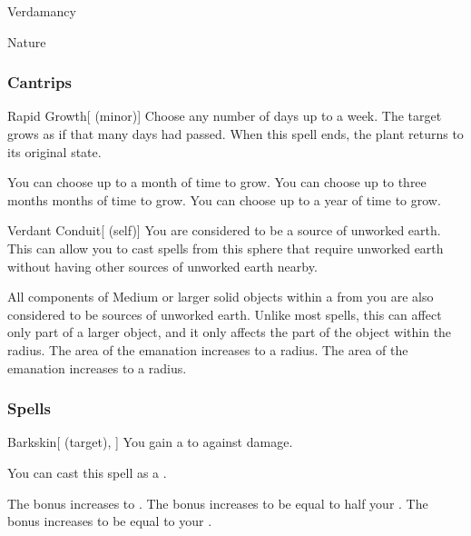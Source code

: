 \newpage
\begin{spellsection}{Verdamancy}

\begin{spellheader}
\end{spellheader}


 Nature

\subsubsection{Cantrips}


\begin{freeability}{Rapid Growth}[ (minor)]
Choose any number of days up to a week.
The target grows as if that many days had passed.
When this spell ends, the plant returns to its original state.

\rankline
{} You can choose up to a month of time to grow.
 You can choose up to three months months of time to grow.
 You can choose up to a year of time to grow.
\end{freeability}


\begin{attuneability}{Verdant Conduit}[ (self)]
You are considered to be a source of unworked earth.
This can allow you to cast spells from this sphere that require unworked earth without having other sources of unworked earth nearby.

\rankline
{} All components of Medium or larger solid objects within a \areasmall {} from you are also considered to be sources of unworked earth.
Unlike most spells, this can affect only part of a larger object, and it only affects the part of the object within the radius.
 The area of the emanation increases to a \areamed radius.
 The area of the emanation increases to a \arealarge radius.
\end{attuneability}

\end{spellsection}


\subsubsection{Spells}


\lowercase{\hypertarget{spell:Barkskin}{}}\label{spell:Barkskin}
\begin{attuneability}[Rank 1]{\hypertarget{spell:Barkskin}{Barkskin}}[ (target), ]
You gain a   to  against  damage.

You can cast this spell as a .

\rankline
{} The bonus increases to .
 The bonus increases to be equal to half your .
 The bonus increases to be equal to your .
\end{attuneability}
\vspace{0.25em}



